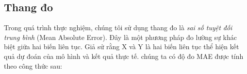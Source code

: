 \documentclass{article}
\begin{document}


\subsection{Thang đo}
Trong quá trình thực nghiệm, chúng tôi sử dụng thang đo là \textit{sai số tuyệt đối trung bình} (Mean Absolute Error). Đây là một phương pháp đo lường sự khác biệt giữa hai biến liên tục. Giả sử rằng X và Y là hai biến liên tục thể hiện kết quả dự đoán của mô hình và kết quả thực tế. chúng ta có độ đo MAE được tính theo công thức sau:
\end{document}
